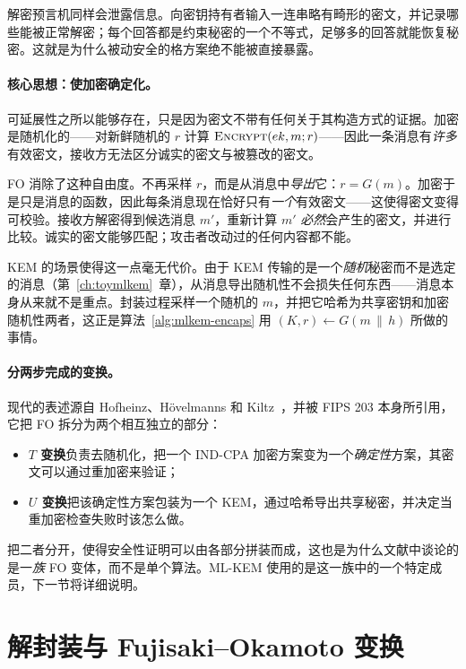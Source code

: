 解密预言机同样会泄露信息。向密钥持有者输入一连串略有畸形的密文，并记录哪些能被正常解密；每个回答都是约束秘密的一个不等式，足够多的回答就能恢复秘密。这就是为什么被动安全的格方案绝不能被直接暴露。

\paragraph{核心思想：使加密确定化。}
可延展性之所以能够存在，只是因为密文不带有任何关于其构造方式的证据。加密是随机化的——对新鲜随机的 $r$ 计算 $\textsc{Encrypt}(ek, m; r)$——因此一条消息有\emph{许多}有效密文，接收方无法区分诚实的密文与被篡改的密文。

FO 消除了这种自由度。不再采样 $r$，而是从消息中\emph{导出}它：$r = G(m)$。加密于是只是消息的函数，因此每条消息现在恰好只有\emph{一个}有效密文——这使得密文变得可校验。接收方解密得到候选消息 $m'$，重新计算 $m'$ \emph{必然}会产生的密文，并进行比较。诚实的密文能够匹配；攻击者改动过的任何内容都不能。

KEM 的场景使得这一点毫无代价。由于 KEM 传输的是一个\emph{随机}秘密而不是选定的消息（第~\ref{ch:toymlkem}~章），从消息导出随机性不会损失任何东西——消息本身从来就不是重点。封装过程采样一个随机的 $m$，并把它哈希为共享密钥和加密随机性两者，这正是算法~\ref{alg:mlkem-encaps} 用 $(K, r) \gets G(m \,\|\, h)$ 所做的事情。

\paragraph{分两步完成的变换。}
现代的表述源自 Hofheinz、H\"ovelmanns 和 Kiltz~\cite{hhk2017}，并被 FIPS 203 本身所引用，它把 FO 拆分为两个相互独立的部分：

\begin{itemize}
  \item \textbf{$T$ 变换}负责去随机化，把一个 IND-CPA 加密方案变为一个\emph{确定性}方案，其密文可以通过重加密来验证；
  \item \textbf{$U$ 变换}把该确定性方案包装为一个 KEM，通过哈希导出共享秘密，并决定当重加密检查失败时该怎么做。
\end{itemize}

把二者分开，使得安全性证明可以由各部分拼装而成，这也是为什么文献中谈论的是一\emph{族} FO 变体，而不是单个算法。ML-KEM 使用的是这一族中的一个特定成员，下一节将详细说明。

\section{解封装与 Fujisaki--Okamoto 变换}

